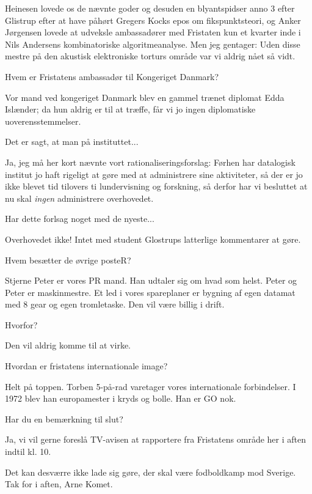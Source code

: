 \documentclass[a4paper,11pt]{article}
\begin{document}
\begin{sketch}
 Heinesen lovede os de nævnte goder og desuden en
blyantspidser anno 3 efter Glistrup efter at have påhørt Gregers Kocks
epos om fikspunktsteori, og Anker Jørgensen lovede at udveksle
ambassadører med Fristaten kun et kvarter inde i Nils Andersens
kombinatoriske algoritmeanalyse.  Men jeg gentager: Uden disse mestre
på den akustisk elektroniske torturs område var vi aldrig nået så
vidt.

 Hvem er Fristatens ambassadør til Kongeriget Danmark?

 Vor mand ved kongeriget Danmark blev en gammel trænet
diplomat Edda Islænder; da hun aldrig er til at træffe, får vi jo
ingen diplomatiske uoverensstemmelser.

 Det er sagt, at man på instituttet...

 Ja, jeg må her kort nævnte vort rationaliseringsforslag:
Førhen har datalogisk institut jo haft rigeligt at gøre med at
administrere sine aktiviteter, så der er jo ikke blevet tid tilovers
ti lundervisning og forskning, så derfor har vi besluttet at nu skal
{\em ingen} administrere overhovedet.

 Har dette forlsag noget med de nyeste...

 Overhovedet ikke!  Intet med student Glostrups latterlige
kommentarer at gøre.

 Hvem besætter de øvrige posteR?

 Stjerne Peter er vores PR mand.  Han udtaler sig om hvad som
helst.  Peter og Peter er maskinmestre.  Et led i vores spareplaner er
bygning af egen datamat med 8 gear og egen tromletaske.  Den vil være
billig i drift.

 Hvorfor?

 Den vil aldrig komme til at virke.

 Hvordan er fristatens internationale image?

 Helt på toppen.  Torben 5-på-rad varetager vores
internationale forbindelser.  I 1972 blev han europamester i kryds og
bolle.  Han er GO nok.

 Har du en bemærkning til slut?

 Ja, vi vil gerne foreslå TV-avisen at rapportere fra
Fristatens område her i aften indtil kl. 10.

 Det kan desværre ikke lade sig gøre, der skal være
fodboldkamp mod Sverige.  Tak for i aften, Arne Komet.



\end{sketch}
\end{document}
